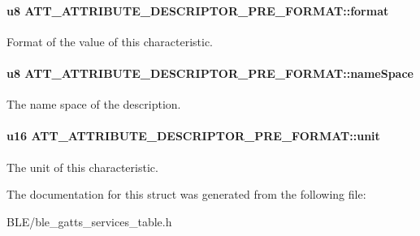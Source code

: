 \paragraph[{\texorpdfstring{format}{format}}]{\setlength{\rightskip}{0pt plus 5cm}u8 A\+T\+T\+\_\+\+A\+T\+T\+R\+I\+B\+U\+T\+E\+\_\+\+D\+E\+S\+C\+R\+I\+P\+T\+O\+R\+\_\+\+P\+R\+E\+\_\+\+F\+O\+R\+M\+A\+T\+::format}\hypertarget{struct_a_t_t___a_t_t_r_i_b_u_t_e___d_e_s_c_r_i_p_t_o_r___p_r_e___f_o_r_m_a_t_a5341b83cdc9f6543c0796e32c434ddd1}{}\label{struct_a_t_t___a_t_t_r_i_b_u_t_e___d_e_s_c_r_i_p_t_o_r___p_r_e___f_o_r_m_a_t_a5341b83cdc9f6543c0796e32c434ddd1}
Format of the value of this characteristic. 
\paragraph[{\texorpdfstring{name\+Space}{nameSpace}}]{\setlength{\rightskip}{0pt plus 5cm}u8 A\+T\+T\+\_\+\+A\+T\+T\+R\+I\+B\+U\+T\+E\+\_\+\+D\+E\+S\+C\+R\+I\+P\+T\+O\+R\+\_\+\+P\+R\+E\+\_\+\+F\+O\+R\+M\+A\+T\+::name\+Space}\hypertarget{struct_a_t_t___a_t_t_r_i_b_u_t_e___d_e_s_c_r_i_p_t_o_r___p_r_e___f_o_r_m_a_t_adb5e22c156e19e4bc473f248125c647f}{}\label{struct_a_t_t___a_t_t_r_i_b_u_t_e___d_e_s_c_r_i_p_t_o_r___p_r_e___f_o_r_m_a_t_adb5e22c156e19e4bc473f248125c647f}
The name space of the description. 
\paragraph[{\texorpdfstring{unit}{unit}}]{\setlength{\rightskip}{0pt plus 5cm}u16 A\+T\+T\+\_\+\+A\+T\+T\+R\+I\+B\+U\+T\+E\+\_\+\+D\+E\+S\+C\+R\+I\+P\+T\+O\+R\+\_\+\+P\+R\+E\+\_\+\+F\+O\+R\+M\+A\+T\+::unit}\hypertarget{struct_a_t_t___a_t_t_r_i_b_u_t_e___d_e_s_c_r_i_p_t_o_r___p_r_e___f_o_r_m_a_t_a250098ffd7a4185faa739e2850dd57f2}{}\label{struct_a_t_t___a_t_t_r_i_b_u_t_e___d_e_s_c_r_i_p_t_o_r___p_r_e___f_o_r_m_a_t_a250098ffd7a4185faa739e2850dd57f2}
The unit of this characteristic. 

The documentation for this struct was generated from the following file\+:\begin{DoxyCompactItemize}
\item 
B\+L\+E/ble\+\_\+gatts\+\_\+services\+\_\+table.\+h\end{DoxyCompactItemize}
